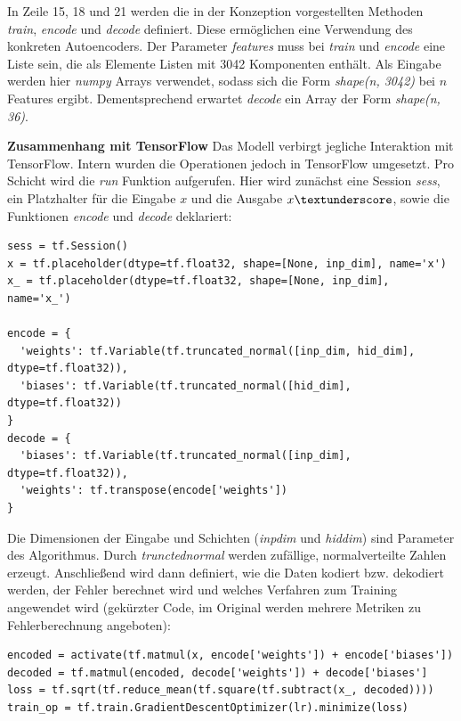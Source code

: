 In Zeile 15, 18 und 21 werden die in der Konzeption vorgestellten Methoden \textit{train}, \textit{encode} und \textit{decode} definiert. Diese ermöglichen eine Verwendung des konkreten Autoencoders. Der Parameter \textit{features} muss bei \textit{train} und \textit{encode} eine Liste sein, die als Elemente Listen mit 3042 Komponenten enthält. Als Eingabe werden hier \textit{numpy} Arrays verwendet, sodass sich die Form \textit{shape(n, 3042)} bei $n$ Features ergibt. Dementsprechend erwartet \textit{decode} ein Array der Form \textit{shape(n, 36)}.\newline

\textbf{Zusammenhang mit TensorFlow} Das Modell verbirgt jegliche Interaktion mit TensorFlow. Intern wurden die Operationen jedoch in TensorFlow umgesetzt. Pro Schicht wird die \textit{run} Funktion aufgerufen. Hier wird zunächst eine Session \textit{sess}, ein Platzhalter für die Eingabe $x$ und die Ausgabe $x\textunderscore$, sowie die Funktionen \textit{encode} und \textit{decode} deklariert:

\begin{lstlisting}[style=Python]
sess = tf.Session()
x = tf.placeholder(dtype=tf.float32, shape=[None, inp_dim], name='x')
x_ = tf.placeholder(dtype=tf.float32, shape=[None, inp_dim], name='x_')

encode = { 
  'weights': tf.Variable(tf.truncated_normal([inp_dim, hid_dim], dtype=tf.float32)),
  'biases': tf.Variable(tf.truncated_normal([hid_dim], dtype=tf.float32))
}
decode = {
  'biases': tf.Variable(tf.truncated_normal([inp_dim], dtype=tf.float32)),
  'weights': tf.transpose(encode['weights'])
}
\end{lstlisting}

Die Dimensionen der Eingabe und Schichten (\textit{inp\textunderscore dim} und \textit{hid\textunderscore dim}) sind Parameter des Algorithmus. Durch \textit{truncted\textunderscore normal} werden zufällige, normalverteilte Zahlen erzeugt. Anschließend wird dann definiert, wie die Daten kodiert bzw. dekodiert werden, der Fehler berechnet wird und welches Verfahren zum Training angewendet wird (gekürzter Code, im Original werden mehrere Metriken zu Fehlerberechnung angeboten):

\begin{lstlisting}[style=Python]
encoded = activate(tf.matmul(x, encode['weights']) + encode['biases'])
decoded = tf.matmul(encoded, decode['weights']) + decode['biases']
loss = tf.sqrt(tf.reduce_mean(tf.square(tf.subtract(x_, decoded))))
train_op = tf.train.GradientDescentOptimizer(lr).minimize(loss)
\end{lstlisting}

